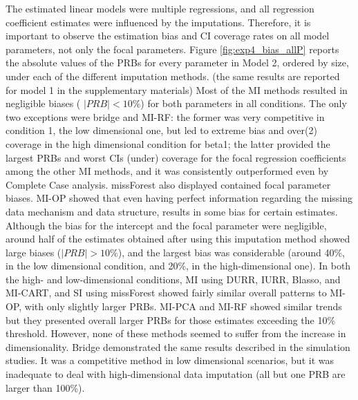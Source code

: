 	The estimated linear models were multiple regressions, and all regression coefficient estimates were 
	influenced by the imputations.
	Therefore, it is important to observe the estimation bias and CI coverage rates on all model parameters, not
	only the focal parameters.
	Figure \ref{fig:exp4_bias_allP} reports the absolute values of the PRBs for every parameter in Model 2, 
	ordered by size, under each of the different imputation methods.
	(the same results are reported for model 1 in the supplementary materials)
	Most of the MI methods resulted in negligible biases ( $| PRB | < 10\%$) for both parameters in all conditions. 
	The only two exceptions were bridge and MI-RF: the former was very competitive in condition 1, the low 
	dimensional one, but led to extreme bias and over(2) coverage in the high dimensional condition for beta1; 
	the latter provided the largest PRBs and worst CIs (under) coverage for the focal regression coefficients 
	among the other MI methods, and it was consistently outperformed even by Complete Case analysis. 
	missForest also displayed contained focal parameter biases.
	MI-OP showed that even having perfect information regarding the missing data mechanism and data structure,
	results in some bias for certain estimates.
	Although the bias for the intercept and the focal parameter were negligible, around half of the estimates 
	obtained after using this imputation method showed large biases ($|PRB|>10\%$), and the largest bias was 
	considerable (around 40\%, in the low dimensional condition, and 20\%, in the high-dimensional one).
	In both the high- and low-dimensional conditions, MI using DURR, IURR, Blasso, and MI-CART, and SI using 
	missForest showed fairly similar overall patterns to MI-OP, with only slightly larger PRBs.
	MI-PCA and MI-RF showed similar trends but they presented overall larger PRBs for those estimates 
	exceeding the 10\% threshold.
	However, none of these methods seemed to suffer from the increase in dimensionality.
	Bridge demonstrated the same results described in the simulation studies. 
	It was a competitive method in low dimensional scenarios, but it was inadequate to deal with high-dimensional 
	data imputation (all but one PRB are larger than 100\%).

